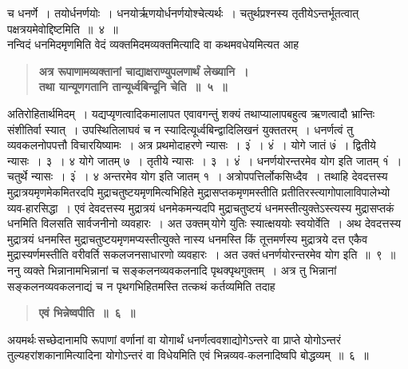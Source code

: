 \documentclass[11pt, openany]{book}
\begin{document}
\newpage

\begin{sloppypar}
\noindent च धनर्णे~। तयोर्धनर्णयोः~। धनयोर्ऋणयोर्धनर्णयोश्चेत्यर्थः~। चतुर्थप्रश्नस्य तृतीयेऽन्तर्भूतत्वात् पक्षत्रयमेवोद्दिष्टमिति~॥~४~॥ \\

{\small नन्विदं धनमिदमृणमिति वेदं व्यक्तमिदमव्यक्तमित्यादि वा कथमवधेयमित्यत आह\textendash }

 \label{1.5}
\begin{quote}
{\large \textbf{{\color{purple}अत्र रूपाणामव्यक्तानां चाद्याक्षराण्युपलणार्थं लेख्यानि~। \\
तथा यान्यूणगतानि तान्यूर्ध्वबिन्दूनि चेति~॥~५~॥ }}}
\end{quote}

अतिरोहितार्थमिदम्~। यद्यप्यृणत्वादिकमालापत एवावगन्तुं शक्यं तथाप्यालापबहुत्व ऋणत्वादौ भ्रान्तिः संशीतिर्वा स्यात्~। उपस्थितिलाघवं च न स्यादित्यूर्ध्वबिन्द्वादिलिखनं युक्ततरम्~। धनर्णत्वं तु व्यवकलनोपपत्तौ विचारयिष्यामः~। अत्र प्रथमोदाहरणे न्यासः~। ३ं~। ४ं~। योगे जातं ७ं~। द्वितीये न्यासः~। ३~। ४ योगे जातम् ७~। तृतीये न्यासः~। ३~। ४ं~। धनर्णयोरन्तरमेव योग इति जातम् १ं~। चतुर्थे न्यासः~। ३ं~। ४ अन्तरमेव योग इति जातम् १~। अत्रोपपत्तिर्लोकसिध्दैव~। तथाहि देवदत्तस्य मुद्रात्रयमृणमेकमितरदपि मुद्राचतुष्टयमृणमित्यभिहिते मुद्रासप्तकमृणमस्तीति प्रतीतिरस्त्यागोपालाविपालेभ्यो व्यव-हारसिद्धा~। एवं देवदत्तस्य मुद्रात्रयं धनमेकमन्यदपि मुद्राचतुष्टयं धनमस्तीत्युक्तेऽस्त्यस्य मुद्रासप्तकं धनमिति विलसति सार्वजनीनो व्यवहारः~। अत उक्तम्\textendash \,योगे युतिः स्यात्क्षययोः स्वयोर्वेति~। अथ देवदत्तस्य मुद्रात्रयं धनमस्ति मुद्राचतुष्टयमृणमप्यस्तीत्युक्ते नास्य धनमस्ति किं तूत्तमर्णस्य मुद्रात्रये दत्त एकैव मुद्रास्यर्णमस्तीति वरीवर्ति सकलजनसाधारणो व्यवहारः~। अत उक्तं\textendash \,धनर्णयोरन्तरमेव योग इति~॥~९~॥\\ 

{\small ननु व्यक्ते भिन्नानामभिन्नानां च सङ्कलनव्यवकलनादि पृथक्पृथगुक्तम्~। अत्र तु भिन्नानां सङ्कलनव्यवकलनाद्यं च न पृथगभिहितमस्ति तत्कथं कर्तव्यमिति तदाह\textendash }

 \label{1.6}
\begin{quote}
\begin{center}
{\large \textbf{{\color{purple}एवं भिन्नेष्वपीति~॥~६~॥}}}
\end{center}
\end{quote}

अयमर्थः\textendash \,सच्छेदानामपि रूपाणां वर्णानां वा योगार्थं धनर्णत्ववशाद्योगेऽन्तरे वा प्राप्ते योगोऽन्तरं तुल्यहरांशकानामित्यादिना योगोऽन्तरं वा विधेयमिति एवं भिन्नव्यव-कलनादिष्वपि बोद्धव्यम्~॥~६~॥\\


\end{sloppypar}
\end{document}
